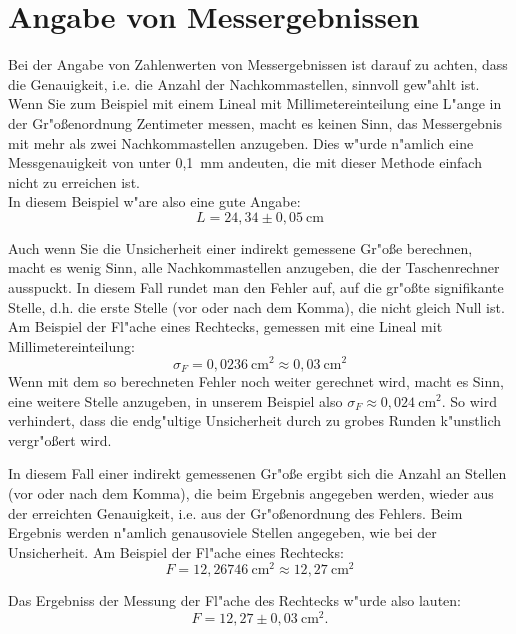 \section{Angabe von Messergebnissen}

Bei der Angabe von Zahlenwerten von Messergebnissen ist darauf zu achten, dass die Genauigkeit, i.e. die Anzahl der Nachkommastellen, sinnvoll gew"ahlt ist. Wenn Sie zum Beispiel mit einem Lineal mit Millimetereinteilung eine L"ange in der Gr"o{\ss}enordnung Zentimeter messen, macht es keinen Sinn, das Messergebnis mit mehr als zwei Nachkommastellen anzugeben. Dies w"urde n"amlich eine Messgenauigkeit von unter 0,1~mm andeuten, die mit dieser Methode einfach nicht zu erreichen ist.\\
In diesem Beispiel w"are also eine gute Angabe:
\begin{equation*}
	L = 24,34 \pm 0,05~\mathrm{cm}
\end{equation*}

Auch wenn Sie die Unsicherheit einer indirekt gemessene Gr"o{\ss}e berechnen, macht es wenig Sinn, alle Nachkommastellen anzugeben, die der Taschenrechner ausspuckt. In diesem Fall rundet man den Fehler auf, auf die gr"o{\ss}te signifikante Stelle, d.h. die erste Stelle (vor oder nach dem Komma), die nicht gleich Null ist. Am Beispiel der Fl"ache eines Rechtecks, gemessen mit eine Lineal mit Millimetereinteilung:
\begin{equation*}
	\sigma_F = 0,0236~\mathrm{cm^2} \approx 0,03~\mathrm{cm^2}
\end{equation*}
Wenn mit dem so berechneten Fehler noch weiter gerechnet wird, macht es Sinn, eine weitere Stelle anzugeben, in unserem Beispiel also $\sigma_F\approx 0,024~\mathrm{cm^2}$. So wird verhindert, dass die endg"ultige Unsicherheit durch zu grobes Runden k"unstlich vergr"o{\ss}ert wird.

In diesem Fall einer indirekt gemessenen Gr"o{\ss}e ergibt sich die Anzahl an Stellen (vor oder nach dem Komma), die beim Ergebnis angegeben werden, wieder aus der erreichten Genauigkeit, i.e. aus der Gr"o{\ss}enordnung des Fehlers. Beim Ergebnis werden n"amlich genausoviele Stellen angegeben, wie bei der Unsicherheit. Am Beispiel der Fl"ache eines Rechtecks:
\begin{equation*}
	F = 12,26746~\mathrm{cm^2} \approx 12,27~\mathrm{cm^2}
\end{equation*}

Das Ergebniss der Messung der Fl"ache des Rechtecks w"urde also lauten:
\begin{equation*}
	F = 12,27 \pm 0,03~\mathrm{cm^2}.
\end{equation*}

